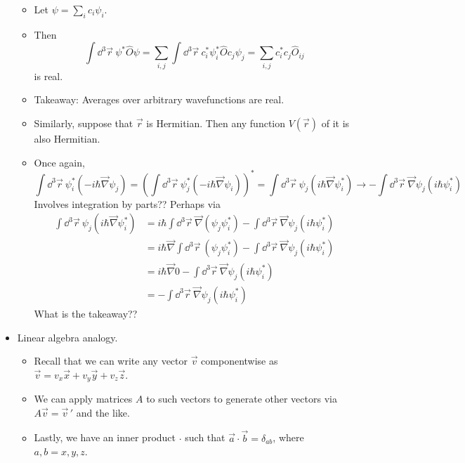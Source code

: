 \documentclass[../notes.tex]{subfiles}
\begin{document}
\begin{itemize}
    \begin{itemize}
        \item Let $\psi=\sum_ic_i\psi_i$.
        \item Then
        \begin{equation*}
            \int\dd^3\vec{r}\ \psi^*\hat{O}\psi = \sum_{i,j}\int\dd^3\vec{r}\ c_i^*\psi_i^*\hat{O}c_j\psi_j
            = \sum_{i,j}c_i^*c_j\hat{O}_{ij}
        \end{equation*}
        is real.
        \item Takeaway: Averages over arbitrary wavefunctions are real.
        \item Similarly, suppose that $\vec{r}$ is Hermitian. Then any function $V(\vec{r})$ of it is also Hermitian.
        \item Once again,
        \begin{equation*}
            \int\dd^3\vec{r}\ \psi_i^*(-i\hbar\vec{\nabla}\psi_j) = \left( \int\dd^3\vec{r}\ \psi_j^*(-i\hbar\vec{\nabla}\psi_i) \right)^*
            = \int\dd^3\vec{r}\ \psi_j(i\hbar\vec{\nabla}\psi_i^*)
            \to -\int\dd^3\vec{r}\ \vec{\nabla}\psi_j(i\hbar\psi_i^*)
        \end{equation*}
        Involves integration by parts?? Perhaps via
        \begin{align*}
            \int\dd^3\vec{r}\ \psi_j(i\hbar\vec{\nabla}\psi_i^*) &= i\hbar\int\dd^3\vec{r}\ \vec{\nabla}(\psi_j\psi_i^*)-\int\dd^3\vec{r}\ \vec{\nabla}\psi_j(i\hbar\psi_i^*)\\
            &= i\hbar\vec{\nabla}\int\dd^3\vec{r}\ (\psi_j\psi_i^*)-\int\dd^3\vec{r}\ \vec{\nabla}\psi_j(i\hbar\psi_i^*)\\
            &= i\hbar\vec{\nabla}0-\int\dd^3\vec{r}\ \vec{\nabla}\psi_j(i\hbar\psi_i^*)\\
            &= -\int\dd^3\vec{r}\ \vec{\nabla}\psi_j(i\hbar\psi_i^*)
        \end{align*}
        What is the takeaway??
    \end{itemize}
    \item Linear algebra analogy.
    \begin{itemize}
        \item Recall that we can write any vector $\vec{v}$ componentwise as $\vec{v}=v_x\vec{x}+v_y\vec{y}+v_z\vec{z}$.
        \item We can apply matrices $A$ to such vectors to generate other vectors via $A\vec{v}=\vec{v}{\,}'$ and the like.
        \item Lastly, we have an inner product $\cdot$ such that $\vec{a}\cdot\vec{b}=\delta_{ab}$, where $a,b=x,y,z$.

\end{itemize}
\end{itemize}
\end{document}
